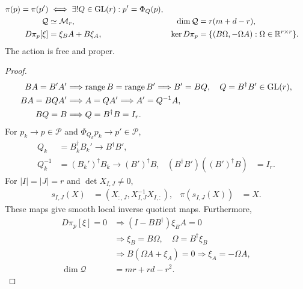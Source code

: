 \begin{theorem}
\label{thm:quotient-space}
\begin{align}
\pi(p)=\pi(p')&\iff\exists!Q\in{\rm GL}(r):p'=\Phi_Q(p),\\
\mathcal Q&\simeq\mathcal M_r,&
\dim\mathcal Q&=r(m+d-r),\\
D\pi_p[\xi]&=\xi_BA+B\xi_A,&
\ker D\pi_p&=\{(B\Omega,-\Omega A):\Omega\in\mathbb R^{r\times r}\}.
\label{eq:rigid-kernel}
\end{align}
The action is free and proper.
\end{theorem}
\begin{proof}
\begin{align}
BA=B'A'&\Longrightarrow\operatorname{range} B=\operatorname{range} B'
\Longrightarrow B'=BQ,\quad Q=B^\dagger B'\in{\rm GL}(r),\\
BA=BQA'&\Longrightarrow A=QA'\Longrightarrow A'=Q^{-1}A,\\
BQ=B&\Longrightarrow Q=B^\dagger B=I_r.
\end{align}
For $p_k\to p\in\mathcal P$ and $\Phi_{Q_k}p_k\to p'\in\mathcal P$,
\begin{align}
Q_k&=B_k^\dagger B_k'\to B^\dagger B',\\
Q_k^{-1}&=(B_k')^\dagger B_k\to(B')^\dagger B,&
(B^\dagger B')((B')^\dagger B)&=I_r.
\end{align}
For $|I|=|J|=r$ and $\det X_{I,J}\ne0$,
\begin{align}
s_{I,J}(X)&=(X_{:,J},X_{I,J}^{-1}X_{I,:}),&
\pi(s_{I,J}(X))&=X.
\label{eq:pivot-section}
\end{align}
These maps give smooth local inverse quotient maps. Furthermore,
\begin{align}
D\pi_p[\xi]=0
&\Longrightarrow(I-BB^\dagger)\xi_BA=0\\
&\Longrightarrow\xi_B=B\Omega,\quad\Omega=B^\dagger\xi_B\\
&\Longrightarrow B(\Omega A+\xi_A)=0
\Longrightarrow\xi_A=-\Omega A,\\
\dim\mathcal Q&=mr+rd-r^2.
\end{align}
\end{proof}

